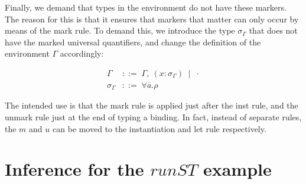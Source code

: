 \documentclass{article}
\begin{document}
Finally, we demand that types in the environment do not have these markers. The reason for this is that it ensures that markers that matter can only occur by means of the mark rule.
To demand this, we introduce the type $\sigma_\Gamma$ that does not have the marked universal quantifiers, and change the definition of the environment $\Gamma$ accordingly:

\begin{displaymath}
\begin{array}{ll}
\Gamma        & ::= \; \Gamma,\:(x\!:\!\sigma_\Gamma) \;\; | \;\; \cdot \\
\sigma_\Gamma & ::= \; \forall \overline{a} . \rho
\end{array}
\end{displaymath}

The intended use is that the mark rule is applied just after the inst rule, and the unmark rule just at the end
of typing a binding. In fact, instead of separate rules, the $m$ and $u$ can be moved to the instantiation and
let rule respectively.

\section{Inference for the $runST$ example}
\end{document}
